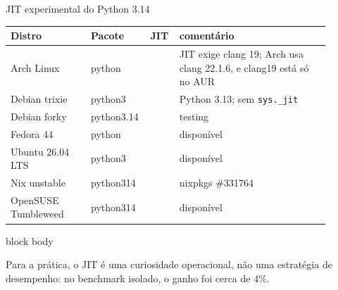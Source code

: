 \documentclass[aspectratio=169,11pt]{beamer}
\newcommand{\callout}[1]{%
  \begin{beamercolorbox}[wd=\linewidth,sep=0.7em,rounded=true]{block body}
    #1
  \end{beamercolorbox}
}
\begin{document}
\begin{frame}{JIT experimental do Python 3.14}
  \newcommand{\jitok}{\raisebox{0.25ex}{\color{caipyraRed}$\checkmark$}}
  \newcommand{\jitno}{\raisebox{0.25ex}{\color{caipyraMuted}$\times$}}
  \footnotesize
  \begin{tabular}{@{}p{0.24\linewidth}p{0.13\linewidth}>{\centering\arraybackslash}p{0.08\linewidth}p{0.45\linewidth}@{}}
    \toprule
    Distro & Pacote & JIT & comentário\\
    \midrule
    Arch Linux & python & \jitno & JIT exige clang 19; Arch usa clang 22.1.6, e clang19 está só no AUR\\
    Debian trixie & python3 & \jitno & Python 3.13; sem \texttt{sys.\_jit}\\
    Debian forky & python3.14 & \jitok & testing\\
    Fedora 44 & python & \jitok & disponível\\
    Ubuntu 26.04 LTS & python3 & \jitok & disponível\\
    Nix unstable & python314 & \jitno & nixpkgs \#331764\\
    OpenSUSE Tumbleweed & python314 & \jitok & disponível\\
    \bottomrule
  \end{tabular}

  \vspace{0.7em}
  \normalsize
  \callout{
    Para a prática, o JIT é uma curiosidade operacional, não uma estratégia de
    desempenho: no benchmark isolado, o ganho foi cerca de 4\%.
  }
\end{frame}
\end{document}

